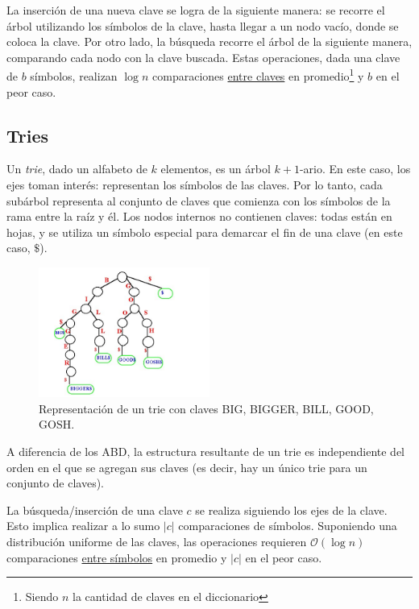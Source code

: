 \documentclass{article}
\newcommand{\BigO}[1]{{\mathcal{O}(#1)}}
\begin{document}
La inserción de una nueva clave se logra de la siguiente manera: se recorre el árbol utilizando los símbolos de la clave, hasta llegar a un nodo vacío, donde se coloca la clave. Por otro lado, la búsqueda recorre el árbol de la siguiente manera, comparando cada nodo con la clave buscada. Estas operaciones, dada una clave de $b$ símbolos, realizan $\log{n}$ comparaciones \underline{entre claves} en promedio\footnote{Siendo $n$ la cantidad de claves en el diccionario} y $b$ en el peor caso.

\subsection{Tries}

Un \textit{trie}, dado un alfabeto de $k$ elementos, es un árbol ${k+1}$-ario. En este caso, los ejes toman interés: representan los símbolos de las claves. Por lo tanto, cada subárbol representa al conjunto de claves que comienza con los símbolos de la rama entre la raíz y él. Los nodos internos no contienen claves: todas están en hojas, y se utiliza un símbolo especial para demarcar el fin de una clave (en este caso, $\$$).

    \label{fig-trie}
    \begin{figure}[H]
        \centering
        \includegraphics[width=0.5\textwidth]{trie.png}
        \caption*{Representación de un trie con claves BIG, BIGGER, BILL, GOOD, GOSH.}
    \end{figure}

    A diferencia de los ABD, la estructura resultante de un trie es independiente del orden en el que se agregan sus claves (es decir, hay un único trie para un conjunto de claves).

    La búsqueda/inserción de una clave $c$ se realiza siguiendo los ejes de la clave. Esto implica realizar a lo sumo $|c|$ comparaciones de símbolos. Suponiendo una distribución uniforme de las claves, las operaciones requieren $\BigO{\log{n}}$ comparaciones \underline{entre símbolos} en promedio y $|c|$ en el peor caso.
\end{document}
